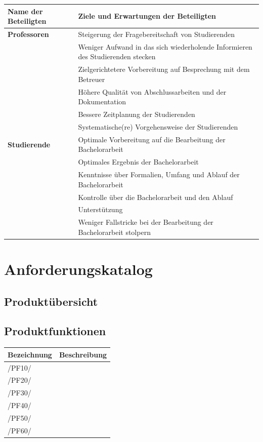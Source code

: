 \documentclass{scrreprt}
\begin{document}
\begin{tabularx}{\textwidth}{l|X}
	\hline
	\textbf{Name der Beteiligten} & \textbf{Ziele und Erwartungen der Beteiligten} \\ \hline
	\textbf{Professoren} 
	& Steigerung der Fragebereitschaft von Studierenden\\
	& Weniger Aufwand in das sich wiederholende Informieren des Studierenden stecken\\
	& Zielgerichtetere Vorbereitung auf Besprechung mit dem Betreuer\\
	& Höhere Qualität von Abschlussarbeiten und der Dokumentation\\
	& Bessere Zeitplanung der Studierenden\\ 
	& Systematische(re) Vorgehensweise der Studierenden\\ \hline
	\textbf{Studierende} 
	& Optimale Vorbereitung auf die Bearbeitung der Bachelorarbeit\\
	& Optimales Ergebnis der Bachelorarbeit\\
	& Kenntnisse über Formalien, Umfang und Ablauf der Bachelorarbeit\\
	& Kontrolle über die Bachelorarbeit und den Ablauf\\
	& Unterstützung \\
	& Weniger Fallstricke bei der Bearbeitung der Bachelorarbeit stolpern\\ \hline
\end{tabularx}
\label{tab:erwartungenBeteiligte}

\newpage
\section{Anforderungskatalog}\label{sec:anforderungskatalog}
\subsection{Produktübersicht}

\subsection{Produktfunktionen}

\begin{tabularx}{\textwidth}{l|X}
	\hline
	\textbf{Bezeichnung} & \textbf{Beschreibung} \\ \hline
	/PF10/ & \\
	/PF20/ & \\
	/PF30/ & \\
	/PF40/ & \\
	/PF50/ & \\
	/PF60/ & \\ \hline
\end{tabularx}
\label{tab:produktfunktionen}
\end{document}
